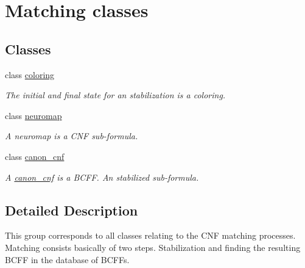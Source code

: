 \hypertarget{group__docgrp__matching__classes}{}\section{Matching classes}
\label{group__docgrp__matching__classes}
\subsection*{Classes}
\begin{DoxyCompactItemize}
\item 
class \hyperlink{classcoloring}{coloring}
\begin{DoxyCompactList}\small\item\em The initial and final state for an stabilization is a coloring. \end{DoxyCompactList}\item 
class \hyperlink{classneuromap}{neuromap}
\begin{DoxyCompactList}\small\item\em A neuromap is a C\+NF sub-\/formula. \end{DoxyCompactList}\item 
class \hyperlink{classcanon__cnf}{canon\+\_\+cnf}
\begin{DoxyCompactList}\small\item\em A \hyperlink{classcanon__cnf}{canon\+\_\+cnf} is a B\+C\+FF. An stabilized sub-\/formula. \end{DoxyCompactList}\end{DoxyCompactItemize}


\subsection{Detailed Description}
This group corresponds to all classes relating to the C\+NF matching processes. Matching consists basically of two steps. Stabilization and finding the resulting B\+C\+FF in the database of B\+C\+F\+Fs. 